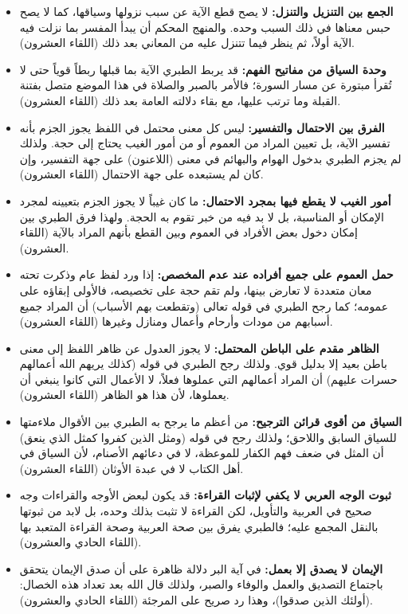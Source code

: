 \begin{itemize}
    \item \textbf{الجمع بين التنزيل والتنزل:} لا يصح قطع الآية عن سبب نزولها وسياقها، كما لا يصح حبس معناها في ذلك السبب وحده. والمنهج المحكم أن يبدأ المفسر بما نزلت فيه الآية أولاً، ثم ينظر فيما تتنزل عليه من المعاني بعد ذلك (اللقاء العشرون).
    \item \textbf{وحدة السياق من مفاتيح الفهم:} قد يربط الطبري الآية بما قبلها ربطاً قوياً حتى لا تُقرأ مبتورة عن مسار السورة؛ فالأمر بالصبر والصلاة في هذا الموضع متصل بفتنة القبلة وما ترتب عليها، مع بقاء دلالته العامة بعد ذلك (اللقاء العشرون).
    \item \textbf{الفرق بين الاحتمال والتفسير:} ليس كل معنى محتمل في اللفظ يجوز الجزم بأنه تفسير الآية، بل تعيين المراد من العموم أو من أمور الغيب يحتاج إلى حجة. ولذلك لم يجزم الطبري بدخول الهوام والبهائم في معنى (اللاعنون) على جهة التفسير، وإن كان لم يستبعده على جهة الاحتمال (اللقاء العشرون).
    \item \textbf{أمور الغيب لا يقطع فيها بمجرد الاحتمال:} ما كان غيباً لا يجوز الجزم بتعيينه لمجرد الإمكان أو المناسبة، بل لا بد فيه من خبر تقوم به الحجة. ولهذا فرق الطبري بين إمكان دخول بعض الأفراد في العموم وبين القطع بأنهم المراد بالآية (اللقاء العشرون).
    \item \textbf{حمل العموم على جميع أفراده عند عدم المخصص:} إذا ورد لفظ عام وذكرت تحته معان متعددة لا تعارض بينها، ولم تقم حجة على تخصيصه، فالأولى إبقاؤه على عمومه؛ كما رجح الطبري في قوله تعالى (وتقطعت بهم الأسباب) أن المراد جميع أسبابهم من مودات وأرحام وأعمال ومنازل وغيرها (اللقاء العشرون).
    \item \textbf{الظاهر مقدم على الباطن المحتمل:} لا يجوز العدول عن ظاهر اللفظ إلى معنى باطن بعيد إلا بدليل قوي. ولذلك رجح الطبري في قوله (كذلك يريهم الله أعمالهم حسرات عليهم) أن المراد أعمالهم التي عملوها فعلاً، لا الأعمال التي كانوا ينبغي أن يعملوها، لأن هذا هو الظاهر (اللقاء العشرون).
    \item \textbf{السياق من أقوى قرائن الترجيح:} من أعظم ما يرجح به الطبري بين الأقوال ملاءمتها للسياق السابق واللاحق؛ ولذلك رجح في قوله (ومثل الذين كفروا كمثل الذي ينعق) أن المثل في ضعف فهم الكفار للموعظة، لا في دعائهم الأصنام، لأن السياق في أهل الكتاب لا في عبدة الأوثان (اللقاء العشرون).
    \item \textbf{ثبوت الوجه العربي لا يكفي لإثبات القراءة:} قد يكون لبعض الأوجه والقراءات وجه صحيح في العربية والتأويل، لكن القراءة لا تثبت بذلك وحده، بل لابد من ثبوتها بالنقل المجمع عليه؛ فالطبري يفرق بين صحة العربية وصحة القراءة المتعبد بها (اللقاء الحادي والعشرون).
    \item \textbf{الإيمان لا يصدق إلا بعمل:} في آية البر دلالة ظاهرة على أن صدق الإيمان يتحقق باجتماع التصديق والعمل والوفاء والصبر، ولذلك قال الله بعد تعداد هذه الخصال: (أولئك الذين صدقوا)، وهذا رد صريح على المرجئة (اللقاء الحادي والعشرون).

\end{itemize}
